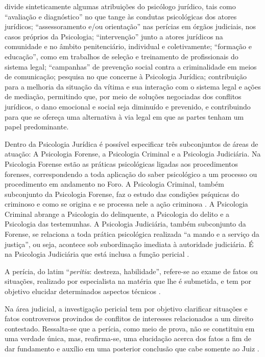  divide sinteticamente algumas atribuições do psicólogo jurídico, tais como ``avaliação e diagnóstico'' no que tange às condutas psicológicas dos atores jurídicos; ``assessoramento e/ou orientação'' nas perícias em órgãos judiciais, nos casos próprios da Psicologia; ``intervenção'' junto a atores jurídicos na comunidade e no âmbito penitenciário, individual e coletivamente; ``formação e educação'', como em trabalhos de seleção e treinamento de profissionais do sistema legal; ``campanhas'' de prevenção social contra a criminalidade em meios de comunicação; pesquisa no que concerne à Psicologia Jurídica; contribuição para a melhoria da situação da vítima e sua interação com o sistema legal e ações de mediação, permitindo que, por meio de soluções negociadas dos conflitos jurídicos, o dano emocional e social seja diminuído e prevenido, e contribuindo para que se ofereça uma alternativa à via legal em que as partes tenham um papel predominante.

Dentro da Psicologia Jurídica é possível especificar três subconjuntos de áreas de atuação: A Psicologia Forense, a Psicologia Criminal e a Psicologia Judiciária. Na Psicologia Forense estão as práticas psicológicas ligadas aos procedimentos forenses, correspondendo a toda aplicação do saber psicológico a um processo ou procedimento em andamento no Foro. A Psicologia Criminal, também subconjunto da Psicologia Forense, faz o estudo das condições psíquicas do criminoso e como se origina e se processa nele a ação criminosa . A Psicologia Criminal abrange a Psicologia do delinquente, a Psicologia do delito e a Psicologia das testemunhas. A Psicologia Judiciária, também subconjunto da Forense, se relaciona a toda prática psicológica realizada ``a mando e a serviço da justiça'', ou seja, acontece sob subordinação imediata à autoridade judiciária. É na Psicologia Judiciária que está inclusa a função pericial \cite{LEAL2008}.

A perícia, do latim ``\emph{peritia}: destreza, habilidade'', refere-se ao exame de fatos ou situações, realizado por especialista na matéria que lhe é submetida, e tem por objetivo elucidar determinados aspectos técnicos .

Na área judicial, a investigação pericial tem por objetivo clarificar situações e fatos controversos provindos de conflitos de interesses relacionados a um direito contestado. Ressalta-se que a perícia, como meio de prova, não se constituiu em uma verdade única, mas, reafirma-se, uma elucidação acerca dos fatos a fim de dar fundamento e auxílio em uma posterior conclusão que cabe somente ao Juiz \cite{ROVINSKI2004}.

